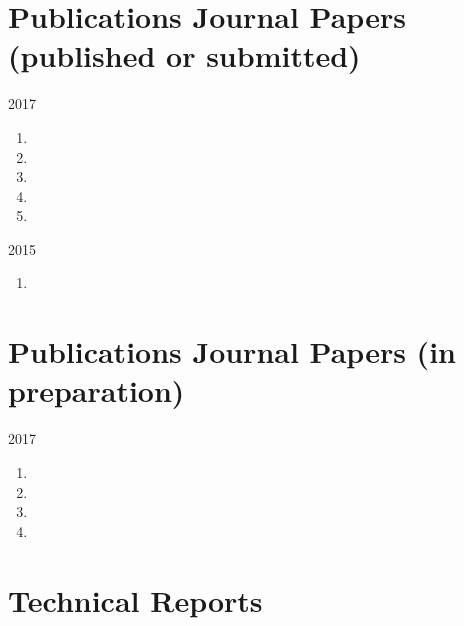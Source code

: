 
\section*{Publications {\small Journal Papers (published or submitted)}}

\begin{paracol}{2}
  \textsc{2017}
\switchcolumn
  \begin{enumerate}
    \item {}
    \item {}
    \item {}
    \item {}
    \item {}
    \setcounter{pubcounter}{\theenumi}
  \end{enumerate}
\end{paracol}

\begin{paracol}{2}
  \textsc{2015}
\switchcolumn
  \begin{enumerate}
    \setcounter{enumi}{\thepubcounter}
    \item {}
    \setcounter{pubcounter}{\theenumi}
  \end{enumerate}
\end{paracol}

\section*{Publications {\small Journal Papers (in preparation)}}

\begin{paracol}{2}
  \textsc{2017}
\switchcolumn
    \begin{enumerate}
      \setcounter{enumi}{\thepubcounter}
      \item {}
      \item {}
      \item {}
      \item {}
      \setcounter{pubcounter}{\theenumi}
    \end{enumerate}
\end{paracol}

\section*{Technical Reports}

